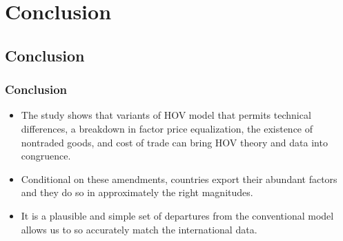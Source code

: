 \documentclass[xcolor=svgnames,10pt]{beamer}
\begin{document}
\section{Conclusion}
\subsection{Conclusion}
\begin{frame}[c]\frametitle{Conclusion}

\begin{itemize}
\item The study shows that variants of HOV model that permits technical differences, a breakdown in factor price equalization, the existence of nontraded goods, and cost of trade can bring HOV theory and data into congruence.
\item  Conditional on these amendments, countries export their abundant factors and they do so in approximately the right magnitudes.
\item  It is a plausible and simple set of departures from the conventional model allows us to so accurately match the international data.
\end{itemize}
\end{frame}
\end{document}
